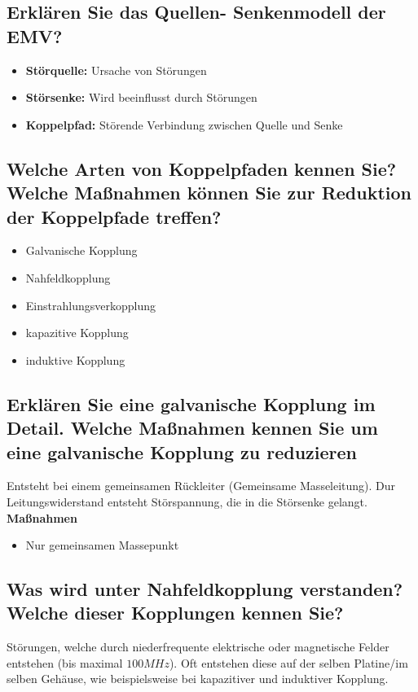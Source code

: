 \subsection{Erklären Sie das Quellen- Senkenmodell der EMV?}
\begin{itemize}
  \item \textbf{Störquelle:} Ursache von Störungen
  \item \textbf{Störsenke:} Wird beeinflusst durch Störungen
  \item \textbf{Koppelpfad:} Störende Verbindung zwischen Quelle und Senke
\end{itemize}

\subsection{Welche Arten von Koppelpfaden kennen Sie? Welche Maßnahmen können Sie zur Reduktion der Koppelpfade treffen?}
\begin{itemize}
  \item Galvanische Kopplung
  \item Nahfeldkopplung
  \item Einstrahlungsverkopplung
  \item kapazitive Kopplung
  \item induktive Kopplung
\end{itemize}

\subsection{Erklären Sie eine galvanische Kopplung im Detail. Welche Maßnahmen kennen Sie um eine galvanische Kopplung zu reduzieren}
Entsteht bei einem gemeinsamen Rückleiter (Gemeinsame Masseleitung). Dur Leitungswiderstand entsteht Störspannung, die in die Störsenke gelangt.\p
\textbf{Maßnahmen}
\begin{itemize}
  \item Nur gemeinsamen Massepunkt
\end{itemize}


\subsection{Was wird unter Nahfeldkopplung verstanden? Welche dieser Kopplungen kennen Sie?}
Störungen, welche durch niederfrequente elektrische oder magnetische Felder entstehen (bis maximal \(100MHz\)). Oft entstehen diese auf der selben Platine/im selben Gehäuse, wie beispielsweise bei kapazitiver und induktiver Kopplung.


